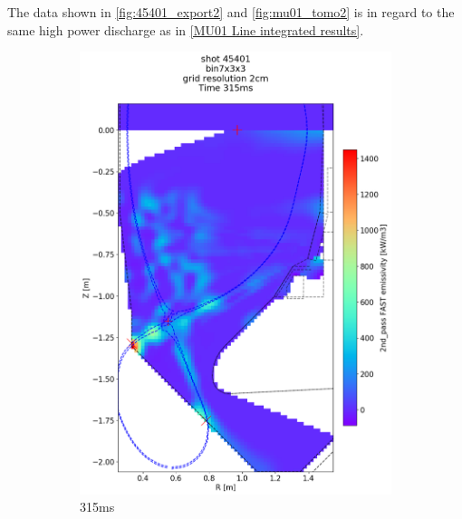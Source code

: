 The data shown in \autoref{fig:45401_export2} and \ref{fig:mu01_tomo2} is in regard to the same high power discharge as in \autoref{MU01 Line integrated results}.
\begin{figure}
     \centering
     \begin{subfigure}{0.395\linewidth}
         \centering
         \includegraphics[trim={75 95 0 195},clip,width=\textwidth]{Chapters/chapter2/figs/IRVB-MASTU_shot-45401_export_88.png}
         \vspace*{-6.5mm}
         \caption{315ms}
         \label{fig:45401_export2_1}
     \end{subfigure}
     \begin{subfigure}{0.395\linewidth}
         \centering

\end{subfigure}
\end{figure}
